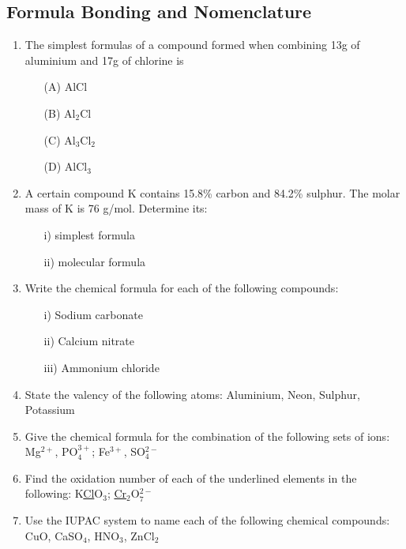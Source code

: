 \subsection{Formula Bonding and Nomenclature}

\begin{enumerate}
	\item The simplest formulas of a compound formed when combining 13g of aluminium and 17g of chlorine is
	\begin{enumerate}[topsep=0ex,itemsep=0ex,partopsep=1ex,parsep=1ex]
		\item[(A)] AlCl
		\item[(B)] Al$_2$Cl
		\item[(C)] Al$_3$Cl$_2$
		\item[(D)] AlCl$_3$
	\end{enumerate}
	
	\item A certain compound K contains 15.8\% carbon and 84.2\% sulphur. The molar mass of K is 76 g/mol. Determine its:
	\begin{enumerate}[topsep=0ex,itemsep=0ex,partopsep=1ex,parsep=1ex]
		\item[i)] simplest formula
		\item[ii)] molecular formula
	\end{enumerate}	
	
	\item Write the chemical formula for each of the following compounds:
	\begin{itemize}[topsep=0ex,itemsep=0ex,partopsep=1ex,parsep=1ex]
		\item[i)] Sodium carbonate
		\item[ii)] Calcium nitrate
		\item[iii)] Ammonium chloride
	\end{itemize}
	
	\item State the valency of the following atoms: Aluminium, Neon, Sulphur, Potassium
	
	\item Give the chemical formula for the combination of the following sets of ions: Mg$^{2+}$, PO$_4^{3+}$; Fe$^{3+}$, SO$_4^{2-}$
	
	\item Find the oxidation number of each of the underlined elements in the following: K\underline{Cl}O$_3$; \underline{Cr$_2$}O$_7^{2-}$
	
	\item Use the IUPAC system to name each of the following chemical compounds: CuO, CaSO$_4$, HNO$_3$, ZnCl$_2$
	

\end{enumerate}
